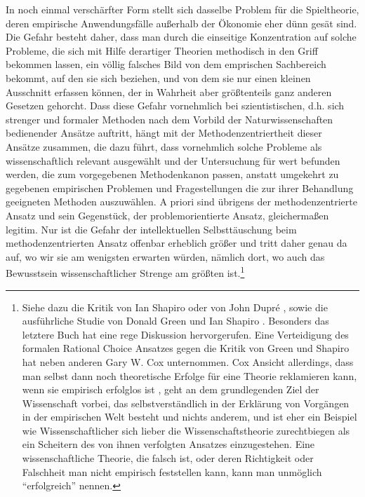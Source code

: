  In noch einmal
verschärfter Form stellt sich dasselbe Problem für die Spieltheorie,
deren empirische Anwendungsfälle außerhalb der Ökonomie eher dünn
gesät sind. Die Gefahr besteht daher, dass man durch die einseitige
Konzentration auf solche Probleme, die sich mit Hilfe derartiger
Theorien methodisch in den Griff bekommen lassen, ein völlig falsches
Bild von dem emprischen Sachbereich bekommt, auf den sie sich
beziehen, und von dem sie nur einen kleinen Ausschnitt erfassen
können, der in Wahrheit aber größtenteils ganz anderen Gesetzen
gehorcht. Dass diese Gefahr vornehmlich bei szientistischen, d.h. sich
strenger und formaler Methoden nach dem Vorbild der
Naturwissenschaften bedienender Ansätze auftritt, hängt mit der
Methodenzentriertheit dieser Ansätze zusammen, die dazu führt, dass
vornehmlich solche Probleme als wissenschaftlich relevant ausgewählt
und der Untersuchung für wert befunden werden, die zum vorgegebenen
Methodenkanon passen, anstatt umgekehrt zu gegebenen empirischen
Problemen und Fragestellungen die zur ihrer Behandlung geeigneten
Methoden auszuwählen. A priori sind übrigens der methodenzentrierte
Ansatz und sein Gegenstück, der problemorientierte Ansatz,
gleichermaßen legitim. Nur ist die Gefahr der intellektuellen
Selbsttäuschung beim methodenzentrierten Ansatz offenbar erheblich
größer und tritt daher genau da auf, wo wir sie am wenigsten erwarten
würden, nämlich dort, wo auch das Bewusstsein wissenschaftlicher
Strenge am größten ist.\footnote{Siehe dazu die Kritik von Ian Shapiro
  \cite{shapiro:2005} oder von John Dupré \cite{dupre:2001}, sowie die
  ausführliche Studie von Donald Green und Ian Shapiro
  \cite{green-shapiro:1994}. Besonders das letztere Buch hat eine rege
  Diskussion hervorgerufen. Eine Verteidigung des formalen Rational
  Choice Ansatzes gegen die Kritik von Green und Shapiro hat neben
  anderen Gary W. Cox\cite{cox:1999} unternommen. Cox Ansicht
  allerdings, dass man selbst dann noch theoretische Erfolge für eine
  Theorie reklamieren kann, wenn sie empirisch erfolglos ist
  \cite[S.159-164]{cox:1999}, geht an dem grundlegenden Ziel der
  Wissenschaft vorbei, das selbstverständlich in der Erklärung von
  Vorgängen in der empirischen Welt besteht und nichts anderem, und
  ist eher ein Beispiel wie Wissenschaftlicher sich lieber die
  Wissenschaftstheorie zurechtbiegen als ein Scheitern des von ihnen
  verfolgten Ansatzes einzugestehen. Eine wissenschaftliche Theorie,
  die falsch ist, oder deren Richtigkeit oder Falschheit man nicht
  empirisch feststellen kann, kann man unmöglich "`erfolgreich"'
  nennen.}

